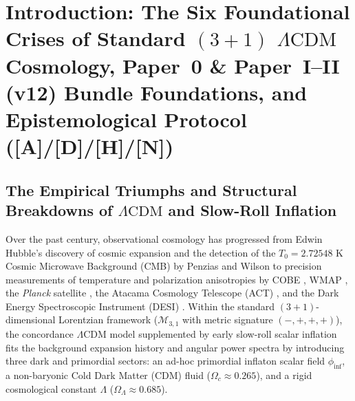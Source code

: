 \documentclass[11pt,a4paper]{article}
\newcommand{\catA}{\textbf{\textcolor{purple!80!black}{[A]}}}
\newcommand{\catD}{\textbf{\textcolor{blue!75!black}{[D]}}}
\newcommand{\catH}{\textbf{\textcolor{orange!85!black}{[H]}}}
\newcommand{\catN}{\textbf{\textcolor{teal!75!black}{[N]}}}
\theoremstyle{plain}
\theoremstyle{definition}
\theoremstyle{remark}
\numberwithin{equation}{section}
\begin{document}
\section{\texorpdfstring{Introduction: The Six Foundational Crises of Standard $(3+1)$ $\Lambda\text{CDM}$ Cosmology, Paper~0 \& Paper~I--II (v12) Bundle Foundations, and Epistemological Protocol (\catA/\catD/\catH/\catN)}{Introduction: The Six Foundational Crises of Standard (3+1) LambdaCDM Cosmology, Paper 0 and Paper I-II (v12) Bundle Foundations, and Epistemological Protocol}}

\subsection{\texorpdfstring{The Empirical Triumphs and Structural Breakdowns of $\Lambda\text{CDM}$ and Slow-Roll Inflation}{The Empirical Triumphs and Structural Breakdowns of LambdaCDM and Slow-Roll Inflation}}

Over the past century, observational cosmology has progressed from Edwin Hubble's discovery of cosmic expansion \cite{hubble1929} and the detection of the $T_0 = 2.72548\text{ K}$ Cosmic Microwave Background (CMB) by Penzias and Wilson \cite{penzias1965,mather1994} to precision measurements of temperature and polarization anisotropies by COBE \cite{smoot1992}, WMAP \cite{hinshaw2013}, the \textit{Planck} satellite \cite{planck2018_vi}, the Atacama Cosmology Telescope (ACT) \cite{aiola2020}, and the Dark Energy Spectroscopic Instrument (DESI) \cite{desi2024_vi}. Within the standard $(3+1)$-dimensional Lorentzian framework ($\mathcal{M}_{3,1}$ with metric signature $(-,+,+,+)$), the concordance $\Lambda\text{CDM}$ model supplemented by early slow-roll scalar inflation \cite{guth1981,linde1982,albrecht1982} fits the background expansion history and angular power spectra by introducing three dark and primordial sectors: an ad-hoc primordial inflaton scalar field $\phi_{\text{inf}}$, a non-baryonic Cold Dark Matter (CDM) fluid ($\Omega_c \approx 0.265$), and a rigid cosmological constant $\Lambda$ ($\Omega_\Lambda \approx 0.685$).
\end{document}
